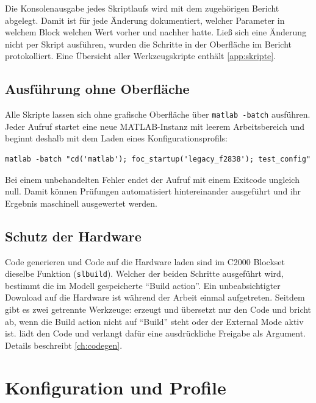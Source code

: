 Die Konsolenausgabe jedes Skriptlaufs wird mit dem zugehörigen Bericht abgelegt. Damit ist
für jede Änderung dokumentiert, welcher Parameter in welchem Block welchen Wert vorher und
nachher hatte. Ließ sich eine Änderung nicht per Skript ausführen, wurden die Schritte in der
Oberfläche im Bericht protokolliert. Eine Übersicht aller Werkzeugskripte enthält
\cref{app:skripte}.

\subsection*{Ausführung ohne Oberfläche}

Alle Skripte lassen sich ohne grafische Oberfläche über
\texttt{matlab -batch} ausführen. Jeder Aufruf startet eine neue MATLAB-Instanz mit leerem
Arbeitsbereich und beginnt deshalb mit dem Laden eines Konfigurationsprofils:

\begin{lstlisting}[language={}, numbers=none, caption={Aufruf eines Prüfskripts aus der
    Kommandozeile}, label=lst:batch]
matlab -batch "cd('matlab'); foc_startup('legacy_f2838'); test_config"
\end{lstlisting}

Bei einem unbehandelten Fehler endet der Aufruf mit einem Exitcode ungleich null. Damit
können Prüfungen automatisiert hintereinander ausgeführt und ihr Ergebnis maschinell
ausgewertet werden.

\subsection*{Schutz der Hardware}

Code generieren und Code auf die Hardware laden sind im C2000 Blockset dieselbe Funktion
(\texttt{slbuild}). Welcher der beiden Schritte ausgeführt wird, bestimmt die im Modell
gespeicherte \enquote{Build action}. Ein unbeabsichtigter Download auf die Hardware ist
während der Arbeit einmal aufgetreten. Seitdem gibt es zwei getrennte Werkzeuge:
 erzeugt und übersetzt nur den Code und bricht ab, wenn die Build action
nicht auf \enquote{Build} steht oder der External Mode aktiv ist.  lädt
den Code und verlangt dafür eine ausdrückliche Freigabe als Argument. Details beschreibt
\cref{ch:codegen}.

\section{Konfiguration und Profile}
\label{sec:profile}

